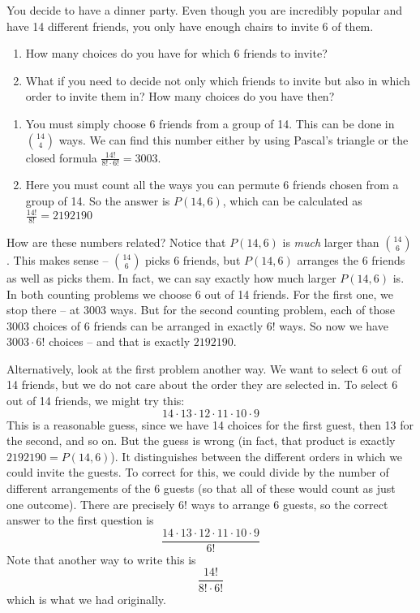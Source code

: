 \documentclass[12pt]{article}
\begin{document}
\begin{example}
  You decide to have a dinner party.  Even though you are incredibly popular and have 14 different friends, you only have enough chairs to invite 6 of them.  
  \begin{enumerate}
    \item How many choices do you have for which 6 friends to invite? 
    \item What if you need to decide not only which friends to invite but also in which order to invite them in?  How many choices do you have then?
  \end{enumerate}
  \begin{solution}
    \begin{enumerate}

      \item You must simply choose 6 friends from a group of 14.  This can be done in ${14 \choose 4}$ ways.  We can find this number either by using Pascal's triangle or the closed formula $\frac{14!}{8!\cdot 6!} = 3003$.
      
      \item Here you must count all the ways you can permute 6 friends chosen from a group of 14.  So the answer is $P(14, 6)$, which can be calculated as $\frac{14!}{8!} = 2192190$
   \end{enumerate}
    How are these numbers related?  Notice that $P(14,6)$ is {\em much} larger than ${14 \choose 6}$.  This makes sense -- ${14 \choose 6}$ picks 6 friends, but $P(14,6)$  arranges the 6 friends as well as picks them.  In fact, we can say exactly how much larger $P(14,6)$ is.  In both counting problems we choose 6 out of 14 friends.  For the first one, we stop there -- at 3003 ways.  But for the second counting problem, each of those 3003 choices of 6 friends can be arranged in exactly $6!$ ways.  So now we have $3003\cdot 6!$ choices -- and that is exactly $2192190$.
    
    Alternatively, look at the first problem another way.  We want to select 6 out of 14 friends, but we do not care about the order they are selected in.  To select 6 out of 14 friends, we might try this:
    \[14 \cdot 13 \cdot 12 \cdot 11 \cdot 10 \cdot 9\]
    This is a reasonable guess, since we have 14 choices for the first guest, then 13 for the second, and so on.  But the guess is wrong (in fact, that product is exactly $2192190 = P(14,6)$).  It distinguishes between the different orders in which we could invite the guests.  To correct for this, we could divide by the number of different arrangements of the 6 guests (so that all of these would count as just one outcome).  There are precisely $6!$ ways to arrange 6 guests, so the correct answer to the first question is
    \[\frac{14 \cdot 13 \cdot 12 \cdot 11\cdot 10 \cdot 9}{6!}\]
    Note that another way to write this is
    \[\frac{14!}{8!\cdot 6!}\]
    which is what we had originally.
  \end{solution}

\end{example}
\end{document}
